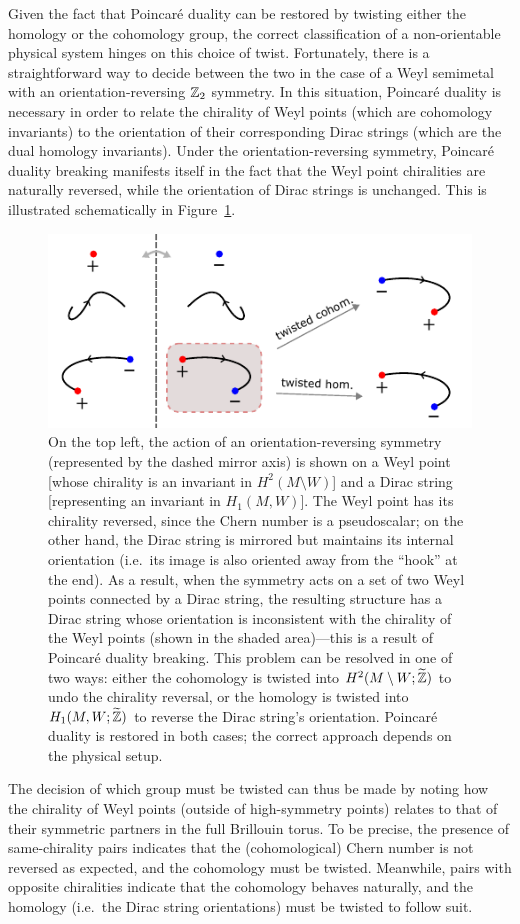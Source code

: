 Given the fact that Poincaré duality can be restored by twisting either the homology or the cohomology group, the correct classification of a non-orientable physical system hinges on this choice of twist. Fortunately, there is a straightforward way to decide between the two in the case of a Weyl semimetal with an orientation-reversing $\mathbb{Z}_2$ symmetry. In this situation, Poincaré duality is necessary in order to relate the chirality of Weyl points (which are cohomology invariants) to the orientation of their corresponding Dirac strings (which are the dual homology invariants). Under the orientation-reversing symmetry, Poincaré duality breaking manifests itself in the fact that the Weyl point chiralities are naturally reversed, while the orientation of Dirac strings is unchanged. This is illustrated schematically in Figure~\ref{fig:local_coefficients}.
\begin{figure}[htb!]
	\centering
	\includegraphics[width=.9\linewidth]{Images/local_coefficients}
	\caption{On the top left, the action of an orientation-reversing symmetry (represented by the dashed mirror axis) is shown on a Weyl point [whose chirality is an invariant in $H^2(M\setminus W)$] and a Dirac string  [representing an invariant in $H_1(M,W)$]. The Weyl point has its chirality reversed, since the Chern number is a pseudoscalar; on the other hand, the Dirac string is mirrored but maintains its internal orientation (i.e.\ its image is also oriented away from the ``hook'' at the end). As a result, when the symmetry acts on a set of two Weyl points connected by a Dirac string, the resulting structure has a Dirac string whose orientation is inconsistent with the chirality of the Weyl points (shown in the shaded area)---this is a result of Poincaré duality breaking. This problem can be resolved in one of two ways: either the cohomology is twisted into $H^2(M\setminus W;\widetilde{\mathbb{Z}})$ to undo the chirality reversal, or the homology is twisted into $H_1(M,W;\widetilde{\mathbb{Z}})$ to reverse the Dirac string's orientation. Poincaré duality is restored in both cases; the correct approach depends on the physical setup.}
	\label{fig:local_coefficients}
\end{figure}
The decision of which group must be twisted can thus be made by noting how the chirality of Weyl points (outside of high-symmetry points) relates to that of their symmetric partners in the full Brillouin torus. To be precise, the presence of same-chirality pairs indicates that the (cohomological) Chern number is not reversed as expected, and the cohomology must be twisted. Meanwhile, pairs with opposite chiralities indicate that the cohomology behaves naturally, and the homology (i.e.\ the Dirac string orientations) must be twisted to follow suit.

